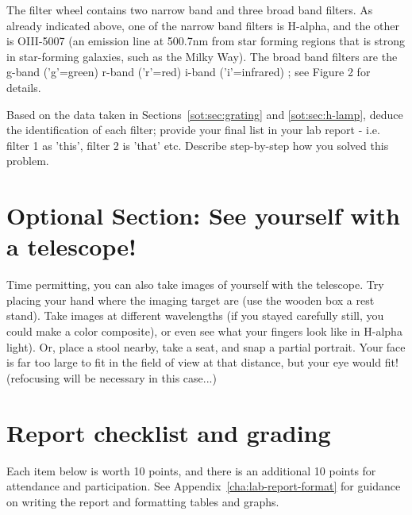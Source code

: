 The filter wheel contains two narrow band and three broad band filters. As already indicated
above, one of the narrow band filters is H-alpha, and the other is OIII-5007 (an emission line
at 500.7nm from star forming regions that is strong in star-forming galaxies, such as the Milky
Way). The broad band filters are the g-band (’g’=green) r-band (’r’=red) i-band (’i’=infrared) ;
see Figure 2 for details.

\begin{steps}
	
	\item Based on the data taken in Sections~\ref{sot:sec:grating} and \ref{sot:sec:h-lamp}, deduce the identification of each filter; provide your final list in your lab report - i.e. filter 1 as ’this’, filter 2 is ’that’ etc. Describe step-by-step how you solved this problem.
\end{steps}

\section{Optional Section: See yourself with a telescope!}

Time permitting, you can also take images of yourself with the telescope.
Try placing your hand where the imaging target are (use the wooden box a
rest stand). Take images at different wavelengths (if you stayed carefully
still, you could make a color composite), or even see what your fingers
look like in H-alpha light). Or, place a stool nearby, take a seat, and
snap a partial portrait. Your face is far too large to fit in the field of
view at that distance, but your eye would fit! (refocusing will be
necessary in this case...)

\section{Report checklist and grading}

Each item below is worth 10 points, and there is an additional 10 points for attendance and participation. See Appendix\ \ref{cha:lab-report-format} for guidance on writing the report and formatting tables and graphs.

